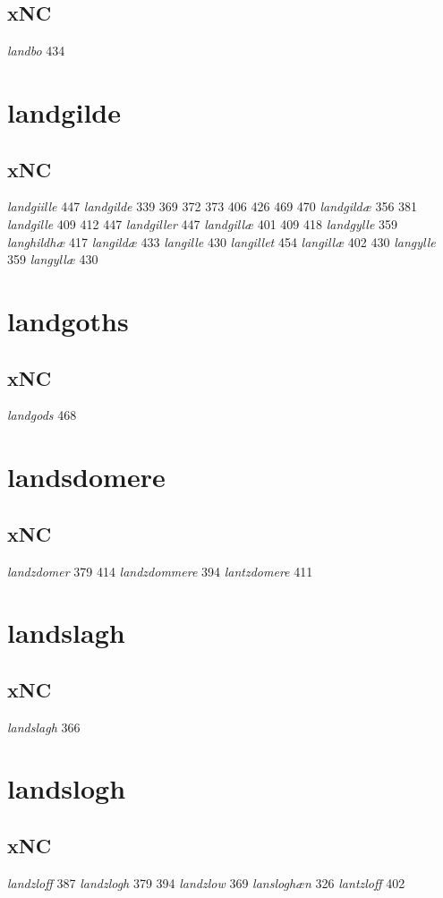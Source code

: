 \documentclass[a4paper,twocolumn]{article}
\begin{document}
\subsection{xNC}
\label{sec:org3f5eb0b}
\emph{landbo} 434 
\section{landgilde}
\label{sec:orgd5f9270}
\subsection{xNC}
\label{sec:org2eb00d7}
\emph{landgiille} 447 \emph{landgilde} 339 369 372 373 406 426 469 470 \emph{landgildæ} 356 381 \emph{landgille} 409 412 447 \emph{landgiller} 447 \emph{landgillæ} 401 409 418 \emph{landgylle} 359 \emph{langhildhæ} 417 \emph{langildæ} 433 \emph{langille} 430 \emph{langillet} 454 \emph{langillæ} 402 430 \emph{langylle} 359 \emph{langyllæ} 430 
\section{landgoths}
\label{sec:org9f21ee3}
\subsection{xNC}
\label{sec:org678b608}
\emph{landgods} 468 
\section{landsdomere}
\label{sec:org04b4ea2}
\subsection{xNC}
\label{sec:orgb8011fc}
\emph{landzdomer} 379 414 \emph{landzdommere} 394 \emph{lantzdomere} 411 
\section{landslagh}
\label{sec:orgd35f565}
\subsection{xNC}
\label{sec:org5fcac53}
\emph{landslagh} 366 
\section{landslogh}
\label{sec:orgb7b1105}
\subsection{xNC}
\label{sec:orgf6baaf0}
\emph{landzloff} 387 \emph{landzlogh} 379 394 \emph{landzlow} 369 \emph{lansloghæn} 326 \emph{lantzloff} 402 
\end{document}
